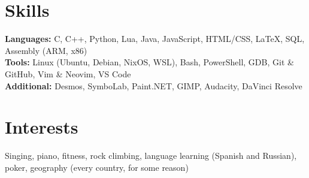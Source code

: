 \documentclass[letterpaper,11pt]{article}
\begin{document}
\section*{Skills}
\vspace*{-0.7em}
\noindent\textbf{Languages:} C, C++, Python, Lua, Java, JavaScript, HTML/CSS, LaTeX, SQL, Assembly (ARM, x86) \quad \\
\textbf{Tools:} Linux (Ubuntu, Debian, NixOS, WSL), Bash, PowerShell, GDB, Git \& GitHub, Vim \& Neovim, VS Code \\
\textbf{Additional:} Desmos, SymboLab, Paint.NET, GIMP, Audacity, DaVinci Resolve

\section*{Interests}
\vspace*{-0.7em}
\noindent Singing, piano, fitness, rock climbing, language learning (Spanish and Russian), poker, geography (every country, for some reason)
\end{document}

